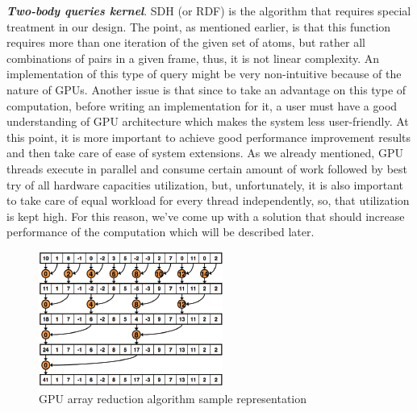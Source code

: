 \documentclass[11pt,a4paper]{report}
\begin{document}
\emph{\textbf{Two-body queries kernel}}.
SDH (or RDF) is the algorithm that requires special treatment in our design. The point, as mentioned earlier, is that this function requires more than one iteration of the given set of atoms, but rather all combinations of pairs in a given frame, thus, it is not linear complexity. An implementation of this type of query might be very non-intuitive because of the nature of GPUs. Another issue is that since to take an advantage on this type of computation, before writing an implementation for it, a user must have a good understanding of GPU architecture which makes the system less user-friendly. At this point, it is more important to achieve good performance improvement results and then take care of ease of system extensions. As we already mentioned, GPU threads execute in parallel and consume certain amount of work followed by best try of all hardware capacities utilization, but, unfortunately, it is also important to take care of equal workload for every thread independently, so, that utilization is kept high. For this reason, we've come up with a solution that should increase performance of the computation which will be described later.

\begin{figure}
 \centerline{ \includegraphics[width=0.65\columnwidth]{images/reduction} }
 \caption{GPU array reduction algorithm sample representation}
 \label{fg:reduction}
\end{figure}
\end{document}
